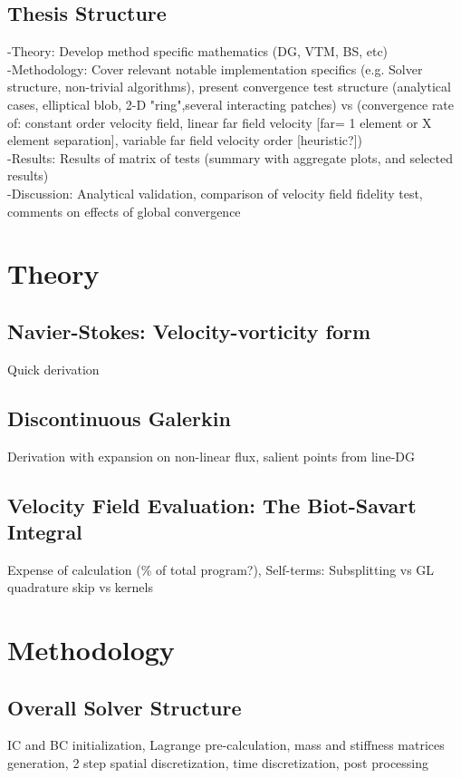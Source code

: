 \documentclass[letterpaper,12pt]{report}
\begin{document}
\subsection{Thesis Structure}
-Theory: Develop method specific mathematics (DG, VTM, BS, etc)\\
-Methodology: Cover relevant notable implementation specifics (e.g. Solver structure, non-trivial algorithms), present convergence test structure (analytical cases, elliptical blob, 2-D "ring",several interacting patches) vs (convergence rate of: constant order velocity field, linear far field velocity [far= 1 element or X element separation], variable far field velocity order [heuristic?])\\
-Results: Results of matrix of tests (summary with aggregate plots, and selected results)\\
-Discussion: Analytical validation, comparison of velocity field fidelity test, comments on effects of global convergence

\section{Theory}
\subsection{Navier-Stokes: Velocity-vorticity form}
Quick derivation
\subsection{Discontinuous Galerkin}
Derivation with expansion on non-linear flux, salient points from line-DG
\subsection{Velocity Field Evaluation: The Biot-Savart Integral}
Expense of calculation (\% of total program?), Self-terms: Subsplitting vs GL quadrature skip vs kernels
\section{Methodology}
\subsection{Overall Solver Structure}
IC and BC initialization, Lagrange pre-calculation, mass and stiffness matrices generation, 2 step spatial discretization, time discretization, post processing
\end{document}
